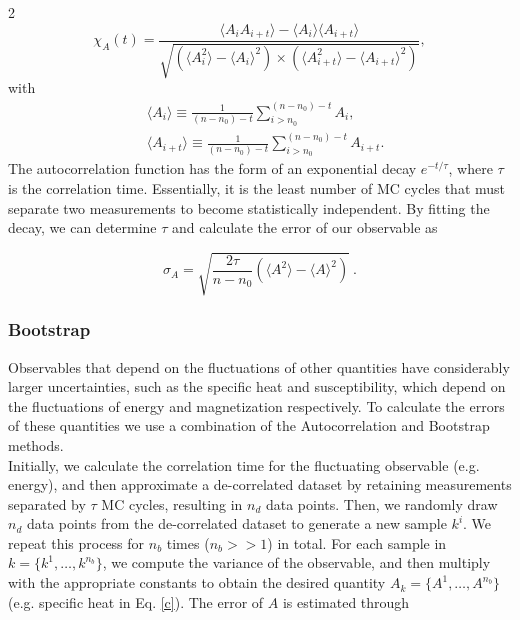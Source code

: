 \documentclass{article}
\begin{document}
\begin{multicols}{2}
\begin{equation}
\chi_A(t) =
\frac{\langle A_i A_{i+t} \rangle - \langle A_i \rangle \langle A_{i+t} \rangle}
{\sqrt{ \left(  \langle A_i^2 \rangle - \langle A_i \rangle^2\right)\times \left( \langle A_{i+t}^2 \rangle - \langle A_{i+t} \rangle^2\right)}},
\end{equation}
with 
\begin{align}
    &\langle A_i \rangle \equiv \frac{1}{(n-n_0)-t} \sum_{i>n_0}^{(n-n_0)-t} A_i,\\
    &\langle A_{i+t} \rangle \equiv \frac{1}{(n-n_0)-t} \sum_{i>n_0}^{(n-n_0)-t} A_{i+t}.
\end{align}
%
The autocorrelation function has the form of an exponential decay $e^{-t/\tau}$, where $\tau$ is the correlation time. Essentially, it is the least number of MC cycles that must separate two measurements to become statistically independent. By fitting the decay, we can determine $\tau$ and calculate the error of our observable as

\begin{equation}
    \sigma_A = \sqrt{\frac{2 \tau}{n-n_0} \left(\langle A^2 \rangle - \langle A \rangle^2\right)} \ .
\end{equation}



\subsubsection{Bootstrap}

Observables that depend on the fluctuations of other quantities have considerably larger uncertainties, such as the specific heat and susceptibility, which depend on the fluctuations of energy and magnetization respectively. To calculate the errors of these quantities we use a combination of the Autocorrelation and Bootstrap \cite{Bootstrap} methods.\\

Initially, we calculate the correlation time for the fluctuating observable (e.g. energy), and then approximate a de-correlated dataset by retaining measurements separated by $\tau$ MC cycles, resulting in $n_d$ data points. Then, we randomly draw $n_d$ data points from the de-correlated dataset to generate a new sample $k^i$. We repeat this process for $n_b$ times ($n_b>>1$) in total. For each sample in $k = \{k^1,\dots,k^{n_b}\}$, we compute the variance of the observable, and then multiply with the appropriate constants to obtain the desired quantity $A_k = \{A^1,\dots,A^{n_b} \}$ (e.g. specific heat in Eq. \eqref{c}). The error of $A$ is estimated through


\end{multicols}
\end{document}
